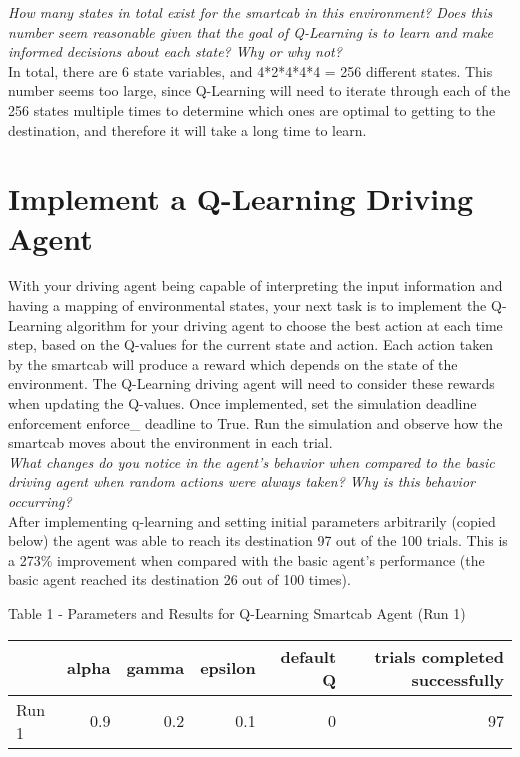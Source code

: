 \documentclass[11pt]{article}
\begin{document}
\textit{How many states in total exist for the smartcab in this environment? Does this number seem reasonable given that the goal of Q-Learning is to learn and make informed decisions about each state? Why or why not?}\\

In total, there are 6 state variables, and 4*2*4*4*4 = 256 different states. This number seems too large, since Q-Learning will need to iterate through each of the 256 states multiple times to determine which ones are optimal to getting to the destination, and therefore it will take a long time to learn.\\

\section{Implement a Q-Learning Driving Agent}

With your driving agent being capable of interpreting the input information and having a mapping of environmental states, your next task is to implement the Q-Learning algorithm for your driving agent to choose the best action at each time step, based on the Q-values for the current state and action. Each action taken by the smartcab will produce a reward which depends on the state of the environment. The Q-Learning driving agent will need to consider these rewards when updating the Q-values. Once implemented, set the simulation deadline enforcement enforce\_ deadline to True. Run the simulation and observe how the smartcab moves about the environment in each trial.\\

\textit{What changes do you notice in the agent's behavior when compared to the basic driving agent when random actions were always taken? Why is this behavior occurring?}\\

After implementing q-learning and setting initial parameters arbitrarily (copied below) the agent was able to reach its destination 97 out of the 100 trials. This is a 273\% improvement when compared with the basic agent’s performance (the basic agent reached its destination 26 out of 100 times).\\

\begin{center} Table 1 - Parameters and Results for Q-Learning Smartcab Agent (Run 1)
\end{center}
\begin{tabular}{ l r r r r r } \\
  \hline
  & alpha & gamma & epsilon & default Q & trials completed successfully\\
  \hline
  Run 1 & 0.9 & 0.2 & 0.1 & 0 & 97 \\
\end{tabular}
\\
\\
\end{document}
